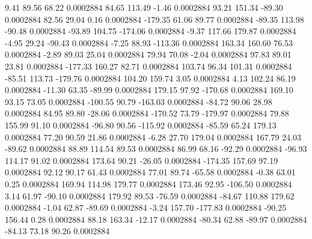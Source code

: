         9.41       89.56       68.22     0.0002884
       84.65      113.49       -1.46     0.0002884
       93.21      151.34      -89.30     0.0002884
       82.56       29.04        0.16     0.0002884
     -179.35       61.06       89.77     0.0002884
      -89.35      113.98      -90.48     0.0002884
      -93.89      104.75     -174.06     0.0002884
       -9.37      117.66      179.87     0.0002884
       -4.95       29.24      -90.43     0.0002884
       -7.25       88.93     -113.36     0.0002884
      163.34      160.60       76.53     0.0002884
       -2.89       89.03       25.04     0.0002884
       79.94       70.08       -2.04     0.0002884
       97.83       89.01       23.81     0.0002884
     -177.33      160.27       82.71     0.0002884
      103.74       96.34      101.31     0.0002884
      -85.51      113.73     -179.76     0.0002884
      104.20      159.74        3.05     0.0002884
        4.13      102.24       86.19     0.0002884
      -11.30       63.35      -89.99     0.0002884
      179.15       97.92     -170.68     0.0002884
      169.10       93.15       73.05     0.0002884
     -100.55       90.79     -163.03     0.0002884
      -84.72       90.06       28.98     0.0002884
       84.95       89.80      -28.06     0.0002884
     -170.52       73.79     -179.97     0.0002884
       79.88      155.99       91.10     0.0002884
      -96.80       90.56     -115.92     0.0002884
      -85.59       65.24      179.13     0.0002884
       77.20       90.59       21.86     0.0002884
       -6.28       27.70      179.04     0.0002884
      167.79       24.03      -89.62     0.0002884
       88.89      114.54       89.53     0.0002884
       86.99       68.16      -92.29     0.0002884
      -96.93      114.17       91.02     0.0002884
      173.64       90.21      -26.05     0.0002884
     -174.35      157.69       97.19     0.0002884
       92.12       90.17       61.43     0.0002884
       77.01       89.74      -65.58     0.0002884
       -0.38       63.01        0.25     0.0002884
      169.94      114.98      179.77     0.0002884
      173.46       92.95     -106.50     0.0002884
        3.14       61.97      -90.10     0.0002884
      179.92       89.53      -76.59     0.0002884
      -84.67      110.88      179.62     0.0002884
       -1.04       62.87      -89.69     0.0002884
       -3.24      157.70     -177.83     0.0002884
      -90.25      156.44        0.28     0.0002884
       88.18      163.34      -12.17     0.0002884
      -80.34       62.88      -89.97     0.0002884
      -84.13       73.18       90.26     0.0002884
